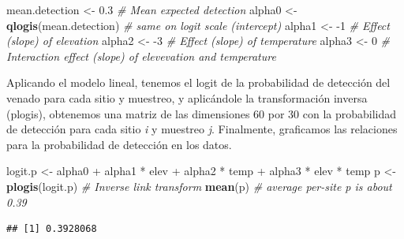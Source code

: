\documentclass[]{book}
\newenvironment{Shaded}{\begin{snugshade}}{\end{snugshade}}
\newcommand{\KeywordTok}[1]{\textcolor[rgb]{0.13,0.29,0.53}{\textbf{{#1}}}}
\newcommand{\DecValTok}[1]{\textcolor[rgb]{0.00,0.00,0.81}{{#1}}}
\newcommand{\FloatTok}[1]{\textcolor[rgb]{0.00,0.00,0.81}{{#1}}}
\newcommand{\StringTok}[1]{\textcolor[rgb]{0.31,0.60,0.02}{{#1}}}
\newcommand{\CommentTok}[1]{\textcolor[rgb]{0.56,0.35,0.01}{\textit{{#1}}}}
\newcommand{\NormalTok}[1]{{#1}}
\begin{document}
\begin{Shaded}
\begin{Highlighting}[]
\NormalTok{mean.detection <-}\StringTok{ }\FloatTok{0.3}            \CommentTok{# Mean expected detection}
\NormalTok{alpha0 <-}\StringTok{ }\KeywordTok{qlogis}\NormalTok{(mean.detection) }\CommentTok{# same on logit scale (intercept)}
\NormalTok{alpha1 <-}\StringTok{ }\NormalTok{-}\DecValTok{1}                     \CommentTok{# Effect (slope) of elevation}
\NormalTok{alpha2 <-}\StringTok{ }\NormalTok{-}\DecValTok{3}                     \CommentTok{# Effect (slope) of temperature}
\NormalTok{alpha3 <-}\StringTok{ }\DecValTok{0}                      \CommentTok{# Interaction effect (slope) of elevevation and temperature}
\end{Highlighting}
\end{Shaded}

Aplicando el modelo lineal, tenemos el logit de la probabilidad de
detección del venado para cada sitio y muestreo, y aplicándole la
transformación inversa (plogis), obtenemos una matriz de las dimensiones
60 por 30 con la probabilidad de detección para cada sitio \emph{i} y
muestreo \emph{j}. Finalmente, graficamos las relaciones para la
probabilidad de detección en los datos.

\begin{Shaded}
\begin{Highlighting}[]
\NormalTok{logit.p <-}\StringTok{ }\NormalTok{alpha0 +}\StringTok{ }\NormalTok{alpha1 *}\StringTok{ }\NormalTok{elev +}\StringTok{ }\NormalTok{alpha2 *}\StringTok{ }\NormalTok{temp +}\StringTok{ }\NormalTok{alpha3 *}\StringTok{ }\NormalTok{elev *}\StringTok{ }\NormalTok{temp}
\NormalTok{p <-}\StringTok{ }\KeywordTok{plogis}\NormalTok{(logit.p)             }\CommentTok{# Inverse link transform }
\KeywordTok{mean}\NormalTok{(p)                          }\CommentTok{# average per-site p is about 0.39}
\end{Highlighting}
\end{Shaded}

\begin{verbatim}
## [1] 0.3928068
\end{verbatim}
\end{document}
